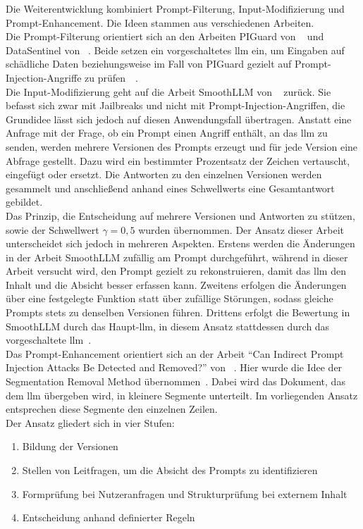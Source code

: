 Die Weiterentwicklung kombiniert Prompt-Filterung, Input-Modifizierung und Prompt-Enhancement. Die Ideen stammen aus verschiedenen Arbeiten. \\
Die Prompt-Filterung orientiert sich an den Arbeiten PIGuard von \citeauthor{sm37}~\cite{sm37} und DataSentinel von \citeauthor{sm39}~\cite{sm39}. Beide setzen ein vorgeschaltetes \ac{llm} ein, um Eingaben auf schädliche
Daten beziehungsweise im Fall von PIGuard gezielt auf Prompt-Injection-Angriffe zu prüfen~\cite[30426]{sm37}~\cite[2194]{sm39}. \\
Die Input-Modifizierung geht auf die Arbeit SmoothLLM von \citeauthor{sm40}~\cite{sm40} zurück. Sie befasst sich zwar mit Jailbreaks und nicht mit Prompt-Injection-Angriffen, die 
Grundidee lässt sich jedoch auf diesen Anwendungsfall übertragen. Anstatt eine Anfrage mit der Frage, ob ein Prompt einen Angriff enthält, an das \ac{llm}
zu senden, werden mehrere Versionen des Prompts erzeugt und für jede Version eine Abfrage gestellt. Dazu wird ein bestimmter Prozentsatz der
Zeichen vertauscht, eingefügt oder ersetzt. Die Antworten zu den einzelnen Versionen werden gesammelt und anschließend anhand eines Schwellwerts eine Gesamtantwort
gebildet. \\
Das Prinzip, die Entscheidung auf mehrere Versionen und Antworten zu stützen, sowie der Schwellwert \(\gamma = 0{,}5\) wurden übernommen. Der Ansatz dieser Arbeit
unterscheidet sich jedoch in mehreren Aspekten. Erstens werden die Änderungen in der Arbeit SmoothLLM zufällig am Prompt durchgeführt, während in dieser Arbeit versucht wird, den 
Prompt gezielt zu rekonstruieren, damit das \ac{llm} den Inhalt und die Absicht besser erfassen kann. Zweitens erfolgen die Änderungen über eine festgelegte Funktion
statt über zufällige Störungen,
sodass gleiche Prompts stets zu denselben Versionen führen. Drittens erfolgt die Bewertung in SmoothLLM durch das Haupt-\ac{llm}, in diesem Ansatz stattdessen 
durch das vorgeschaltete \ac{llm}~\cite{sm40}. \\
Das Prompt-Enhancement orientiert sich an der Arbeit \enquote{Can Indirect Prompt Injection Attacks Be Detected and Removed?} von \citeauthor{sm41}~\cite{sm41}. Hier wurde die Idee der Segmentation
Removal Method übernommen~\cite[18193]{sm41}. Dabei wird das Dokument, das dem \ac{llm} übergeben wird, in kleinere Segmente unterteilt. Im vorliegenden Ansatz
entsprechen diese Segmente den einzelnen Zeilen. \\
Der Ansatz gliedert sich in vier Stufen:
\begin{enumerate}
    \item Bildung der Versionen
    \item Stellen von Leitfragen, um die Absicht des Prompts zu identifizieren
    \item Formprüfung bei Nutzeranfragen und Strukturprüfung bei externem Inhalt
    \item Entscheidung anhand definierter Regeln
\end{enumerate}
